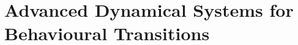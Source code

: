 \chapter{Advanced Dynamical Systems for Behavioural Transitions}
\label{ch:advanced-dynamics}








